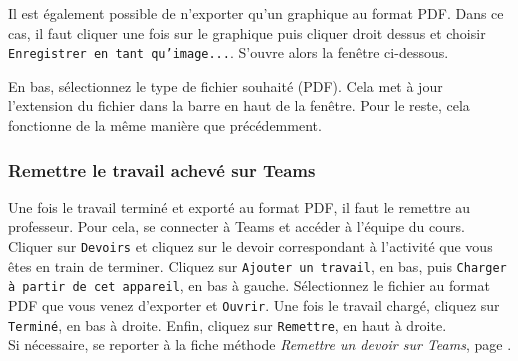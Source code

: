 Il est également possible de n'exporter qu'un graphique au format PDF. Dans ce cas, il faut cliquer une fois sur le graphique puis cliquer droit dessus et choisir \texttt{Enregistrer en tant qu'image...}. S'ouvre alors la fenêtre ci-dessous.


En bas, sélectionnez le type de fichier souhaité (PDF).  Cela met à jour l'extension du fichier dans la barre en haut de la fenêtre.  Pour le reste, cela fonctionne de la même manière que précédemment.



\subsubsection{Remettre le travail achevé sur Teams}

Une fois le travail terminé et exporté au format PDF, il faut le remettre au professeur. Pour cela, se connecter à Teams et accéder à l'équipe du cours. Cliquer sur \texttt{Devoirs} et cliquez sur le devoir correspondant à l'activité que vous êtes en train de terminer. Cliquez sur \texttt{Ajouter un travail}, en bas, puis \texttt{Charger à partir de cet appareil}, en bas à gauche. Sélectionnez le fichier au format PDF que vous venez d'exporter et \texttt{Ouvrir}. Une fois le travail chargé, cliquez sur \texttt{Terminé}, en bas à droite. Enfin, cliquez sur \texttt{Remettre}, en haut à droite.\\



Si nécessaire, se reporter à la fiche méthode \emph{Remettre un devoir sur Teams}, page \pageref{TeamsRemettreDevoir}.



\poubelle{


}